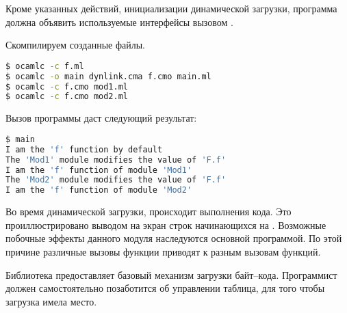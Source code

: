 Кроме указанных действий, инициализации динамической загрузки, программа должна 
объявить используемые интерфейсы вызовом .

Скомпилируем созданные файлы.

\begin{lstlisting}[language=Bash]
$ ocamlc -c f.ml
$ ocamlc -o main dynlink.cma f.cmo main.ml
$ ocamlc -c f.cmo mod1.ml
$ ocamlc -c f.cmo mod2.ml
\end{lstlisting}

Вызов программы  даст следующий результат: 

\begin{lstlisting}[language=Bash]
$ main
I am the 'f' function by default
The 'Mod1' module modifies the value of 'F.f'
I am the 'f' function of module 'Mod1'
The 'Mod2' module modifies the value of 'F.f'
I am the 'f' function of module 'Mod2'
\end{lstlisting}

Во время динамической загрузки, происходит выполнения кода. Это 
проиллюстрировано выводом на экран строк начинающихся на . 
Возможные побочные эффекты данного модуля наследуются основной программой. По 
этой причине различные вызовы функции  приводят к разным вызовам 
функций.

Библиотека  предоставляет базовый механизм  
загрузки байт--кода. Программист должен самостоятельно позаботится об 
управлении таблица, для того чтобы загрузка имела место.

